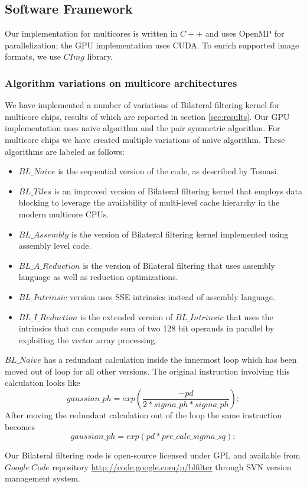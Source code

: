 \documentclass{IEEEtran}
\begin{document}
\subsection{Software Framework}

\label{subsec:sw} Our implementation for multicores is written in $C++$ and uses OpenMP for parallelization; the GPU implementation uses CUDA. To enrich supported image formats, we use $CImg$ library. 
\subsubsection{Algorithm variations on multicore architectures}
We have implemented a number of variations of Bilateral filtering kernel for multicore chips, results of which are reported in section \ref{sec:results}. Our GPU implementation uses naive algorithm and the pair symmetric algorithm. For multicore chips we have created multiple variations of naive algorithm. These algorithms are labeled as follows: 
\begin{itemize}
\item $BL\_Naive$ is the sequential version of the code, as described by Tomasi\cite{Tomasi1998}. 
\item $BL\_Tiles$ is an improved version of Bilateral filtering kernel that employs data blocking to leverage the availability of multi-level cache hierarchy in the modern multicore CPUs.   
\item $BL\_Assembly$ is the version of Bilateral filtering kernel implemented using assembly level code. 
\item $BL\_A\_Reduction$ is the version of Bilateral filtering that uses assembly language as well as reduction optimizations. 
\item $BL\_Intrinsic$ version uses SSE intrinsics instead of assembly language.
\item $BL\_I\_Reduction$ is the extended version of $BL\_Intrinsic$ that uses the intrinsics that can compute sum of two 128 bit operands in parallel by exploiting the vector array processing. 
\end{itemize}
$BL\_Naive$ has a redundant calculation inside the innermost loop which has been moved out of loop for all other versions. The original instruction involving this calculation looks like
 $$gaussian\_ph = exp\left( \frac{-pd} {2 * sigma\_ph*sigma\_ph}\right);$$
After moving the redundant calculation out of the loop the same instruction becomes
 $$gaussian\_ph = exp( pd * pre\_calc\_sigma\_sq );$$ 
 
Our Bilateral filtering code is open-source licensed under GPL and available from $Google~Code$ repository \url{http://code.google.com/p/blfilter} through SVN version management system. 
\end{document}
